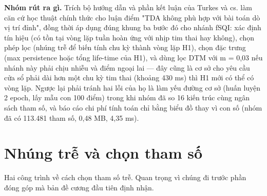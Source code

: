 \documentclass[12pt,a4paper]{article}
\begin{document}
\noindent \textbf{\color{tdtblue}Nhóm rút ra gì.} Trích bộ hướng dẫn và phần kết luận của Turkes và cs. làm căn cứ học thuật chính thức cho luận điểm "TDA không phù hợp với bài toán dò vị trí đỉnh", đồng thời áp dụng đúng khung ba bước đó cho nhánh fSQI: xác định tín hiệu (có tồn tại vòng lặp tuần hoàn ứng với nhịp tim thai hay không), chọn phép lọc (nhúng trễ để biến tính chu kỳ thành vòng lặp H1), chọn đặc trưng (max persistence hoặc tổng life-time của H1), và dùng lọc DTM với m = 0,03 nếu nhánh này phải chịu nhiễu và điểm ngoại lai — đây cũng là cơ sở cho yêu cầu cửa sổ phải dài hơn một chu kỳ tim thai (khoảng 430 ms) thì H1 mới có thể có vòng lặp. Ngược lại phải tránh hai lỗi của họ là làm yếu đường cơ sở (huấn luyện 2 epoch, lấy mẫu con 100 điểm) trong khi nhóm đã so 16 kiến trúc cùng ngân sách tham số, và báo cáo chi phí tính toán chỉ bằng biểu đồ thay vì con số (nhóm đã có 113.481 tham số, 0,48 MB, 4,35 ms).\par\vspace{3pt}
\vspace{6pt}
\clearpage
\section{Nhúng trễ và chọn tham số}
Hai công trình về cách chọn tham số trễ. Quan trọng vì chúng đi trước phần đóng góp mà bản đề cương đầu tiên định nhận.
\end{document}

